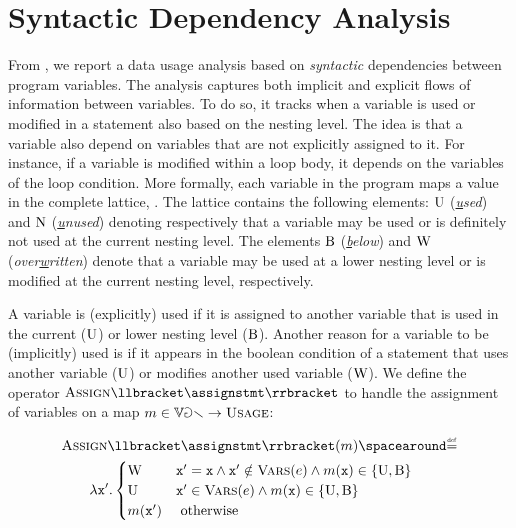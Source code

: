 \section{Syntactic Dependency Analysis}

From , we report a data usage analysis based on \emph{syntactic} dependencies between program variables.
The analysis captures both implicit and explicit flows of information between variables.
To do so, it tracks when a variable is used or modified in a statement also based on the nesting level. The idea is that a variable also depend on variables that are not explicitly assigned to it.
For instance, if a variable is modified within a loop body, it depends on the variables of the loop condition.
More formally, each variable in the program maps a value in the \usage{} complete lattice, .
The lattice contains the following elements: $\textup{U}$ (\emph{\underline{u}sed}) and $\textup{N}$ (\emph{\underline{u}nused}) denoting respectively that a variable may be used or is definitely not used at the current nesting level.
The elements $\textup{B}$ (\emph{\underline{b}elow}) and $\textup{W}$ (\emph{over\underline{w}ritten}) denote that a variable may be used at a lower nesting level or is modified at the current nesting level, respectively.

A variable is (explicitly) used if it is assigned to another variable that is used in the current ($\textup{U}$) or lower nesting level ($\textup{B}$). Another reason for a variable to be (implicitly) used is if it appears in the boolean condition of a statement that uses another variable ($\textup{U}$) or modifies another used variable ($\textup{W}$).
We define the operator $\usageassign\semanticsof{\assignstmt}$ to handle the assignment of variables on a map $m\in\mathbb{Var}\to\textsc{Usage}$:


\begin{align*}
  & \usageassign\semanticsof{\assignstmt}(\usagemap) \DefeQ \\
  &\qquad \lambda \defvariable'.
  \begin{cases}
    \overwrittentag & \defvariable' = \defvariable \land \defvariable' \notin \variablesof{\defaexp} \land \usagemap(\defvariable) \in\{ \usedtag, \belowtag\} \\
    \usedtag & \defvariable' \in \variablesof{\defaexp} \land \usagemap(\defvariable) \in \{ \usedtag, \belowtag\} \\
    \usagemap(\defvariable') & \text{ otherwise}
  \end{cases}
\end{align*}

